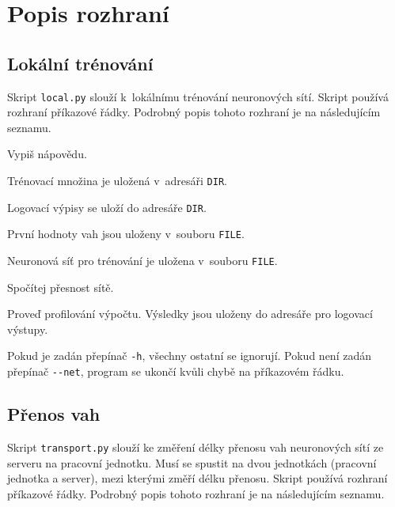 \chapter{Popis rozhraní}
\label{chap:interface_description}


\section{Lokální trénování}
\label{sec:script_local}

Skript {\tt local.py} slouží k~lokálnímu trénování neuronových sítí.
Skript používá rozhraní příkazové řádky.
Podrobný popis tohoto rozhraní je na následujícím seznamu.

\begin{description}[font=\ttfamily\bfseries]
    \item[-{}h]
    Vypiš nápovědu.
    \item[-{}-datadir DIR]
    Trénovací množina je uložená v~adresáři {\tt DIR}.
    \item[-{}-logdir DIR]
    Logovací výpisy se uloží do adresáře {\tt DIR}.
    \item[-{}-weights FILE]
    První hodnoty vah jsou uloženy v~souboru {\tt FILE}.
    \item[-{}-net FILE]
    Neuronová síť pro trénování je uložena v~souboru {\tt FILE}.
    \item[-{}-accuracy]
    Spočítej přesnost sítě.
    \item[-{}-profile]
    Proveď profilování výpočtu.
    Výsledky jsou uloženy do adresáře pro logovací výstupy. 
\end{description}

Pokud je zadán přepínač {\tt -h}, všechny ostatní se ignorují.
Pokud není zadán přepínač {\tt -{}-net}, program se ukončí kvůli chybě na příkazovém řádku.

\section{Přenos vah}
\label{sec:script_trans}

Skript {\tt transport.py} slouží ke změření délky přenosu vah neuronových sítí ze serveru na pracovní jednotku.
Musí se spustit na dvou jednotkách (pracovní jednotka a server), mezi kterými změří délku přenosu.
Skript používá rozhraní příkazové řádky.
Podrobný popis tohoto rozhraní je na následujícím seznamu.

